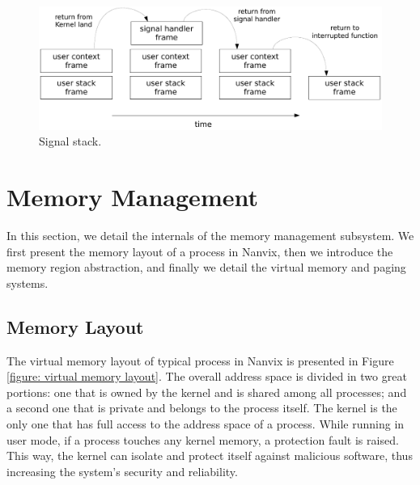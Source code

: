 \documentclass[10pt,a4paper]{article}
\begin{document}
\begin{figure}[b]
	\centering
	\includegraphics[scale=0.55]{img/signal-stack}
	\caption{Signal stack.}
	\label{figure: signal stack}
\end{figure}

\section{Memory Management}

In this section, we detail the internals of the memory management subsystem. We first present the memory layout of a process in Nanvix, then we introduce the memory region abstraction, and finally we detail the virtual memory and paging systems.

\subsection{Memory Layout}
\label{subsection: memory layout}

The virtual memory layout of typical process in Nanvix is presented in Figure \ref{figure: virtual memory layout}. The overall address space is divided in two great portions: one that is owned by the kernel and is shared among all processes; and a second one that is private and belongs to the process itself. The kernel is the only one that has full access to the address space of a process. While running in user mode, if a process touches any kernel memory, a protection fault is raised. This way, the kernel can isolate and protect itself against malicious software, thus increasing the system's security and reliability.
\end{document}
